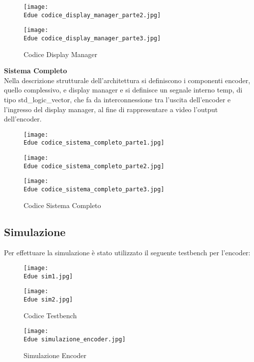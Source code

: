 \documentclass[12pt]{article}
\def \Edue {Allegati/Esercizio2/}
\begin{document}
\begin{figure}[ht]
    \centering
    \texttt{[image: \\Edue codice\_display\_manager\_parte2.jpg]}
\end{figure}
\begin{figure}[ht!]
    \centering
    \texttt{[image: \\Edue codice\_display\_manager\_parte3.jpg]}
    \caption{Codice Display Manager}
\end{figure}
\newpage
{\large \textbf{Sistema Completo}}
\\Nella descrizione strutturale dell’architettura si definiscono i componenti encoder, quello complessivo, e display manager e si definisce un segnale interno temp, di tipo std\_logic\_vector, che fa da interconnessione tra l’uscita dell’encoder e l’ingresso del display manager, al fine di rappresentare a video l’output dell’encoder.
\begin{figure}[ht!]
    \centering
    \texttt{[image: \\Edue codice\_sistema\_completo\_parte1.jpg]}
\end{figure}
\begin{figure}[ht!]
    \centering
    \texttt{[image: \\Edue codice\_sistema\_completo\_parte2.jpg]}
\end{figure}
\begin{figure}[ht!]
    \centering
    \texttt{[image: \\Edue codice\_sistema\_completo\_parte3.jpg]}
    \caption{Codice Sistema Completo}
\end{figure}
\subsection{Simulazione}
Per effettuare la simulazione è stato utilizzato il seguente testbench per l’encoder:
\begin{figure}[ht]
    \centering
    \texttt{[image: \\Edue sim1.jpg]}
\end{figure}
\begin{figure}[ht!]
    \centering
    \texttt{[image: \\Edue sim2.jpg]}
    \caption{Codice Testbench}
\end{figure}
\begin{figure}[ht]
    \centering
    \texttt{[image: \\Edue simulazione\_encoder.jpg]}
    \caption{Simulazione Encoder}
\end{figure}
\clearpage
\end{document}
